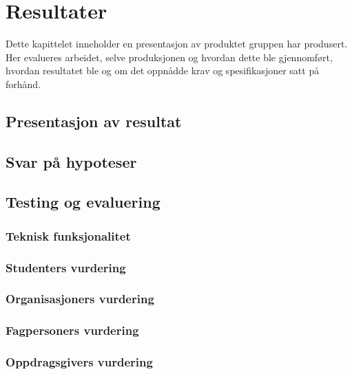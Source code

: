 \cleardoublepage
\chapter{Resultater}
\label{chap:results} 

Dette kapittelet inneholder en presentasjon av produktet gruppen har produsert. Her evalueres arbeidet, selve produksjonen og hvordan dette ble gjennomført, hvordan resultatet ble og om det oppnådde krav og spesifikasjoner satt på forhånd.

\section{Presentasjon av resultat}

\section{Svar på hypoteser}

\section{Testing og evaluering}

\subsection{Teknisk funksjonalitet}

\subsection{Studenters vurdering}

\subsection{Organisasjoners vurdering}

\subsection{Fagpersoners vurdering}

\subsection{Oppdragsgivers vurdering}



